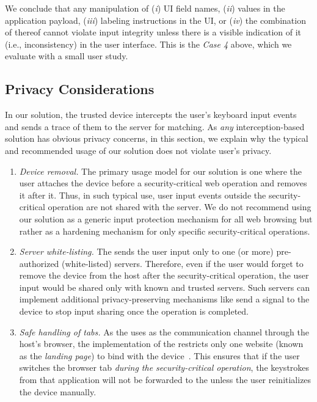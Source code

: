 We conclude that any manipulation of (\emph{i}) UI field names, (\emph{ii}) values in the application payload, (\emph{iii}) labeling instructions in the UI, or (\emph{iv}) the combination of thereof cannot violate input integrity unless there is a visible indication of it (i.e., inconsistency) in the user interface. This is the \emph{Case 4} above, which we evaluate with a small user study.



\subsection{Privacy Considerations} 
\label{sec:privacy}

In our solution, the trusted \device device intercepts the user's keyboard input events and sends a trace of them to the server for matching. As \emph{any} interception-based solution has obvious privacy concerns, in this section, we explain why the typical and recommended usage of our solution does not violate user's privacy.


\begin{enumerate}
	\item \emph{Device removal.} The primary usage model for our solution is one where the user attaches the \device device before a security-critical web operation and removes it after it. Thus, in such typical use, user input events outside the security-critical operation are not shared with the server. We do not recommend using our solution as a generic input protection mechanism for all web browsing but rather as a hardening mechanism for only specific security-critical operations.

	\item \emph{Server white-listing.} The \device sends the user input only to one (or more) pre-authorized (white-listed) servers. Therefore, even if the user would forget to remove the \device device from the host after the security-critical operation, the user input would be shared only with known and trusted servers. Such servers can implement additional privacy-preserving mechanisms like send a signal to the device to stop input sharing once the operation is completed.

	\item \emph{Safe handling of tabs.} As the \device uses \webusb as the communication channel through the host's browser, the implementation of the \webusb restricts only one website (known as the \emph{landing page}) to bind with the \usb device~\cite{webuseb_google}. This ensures that if the user switches the browser tab \emph{during the security-critical operation}, the keystrokes from that application will not be forwarded to the \device unless the user reinitializes the device manually.
\end{enumerate}

